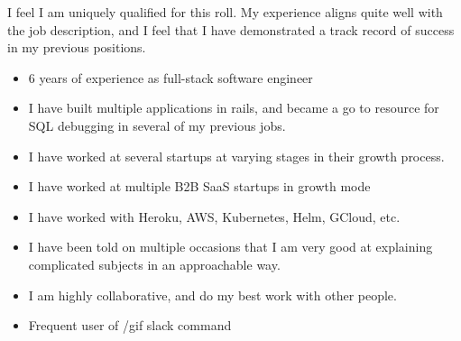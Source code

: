 %
%
%


\par{
	I feel I am uniquely qualified for this roll. My experience aligns quite well with the job description, and I feel that I have demonstrated a track record of success  in my previous positions.
}
\begin{itemize}
	\item 6 years of experience as full-stack software engineer
	\item I have built multiple applications in rails, and became a go to resource for SQL debugging in several of my previous jobs.
	\item I have worked at several startups at varying stages in their growth process.
	\item I have worked at multiple B2B SaaS startups in growth mode
	\item I have worked with Heroku, AWS, Kubernetes, Helm,  GCloud, etc.
	\item I  have been told on  multiple occasions that I am very good at explaining complicated subjects in an approachable way.
	\item I am highly collaborative, and do my best work with other people.
	\item Frequent user of /gif slack command
  \end{itemize}